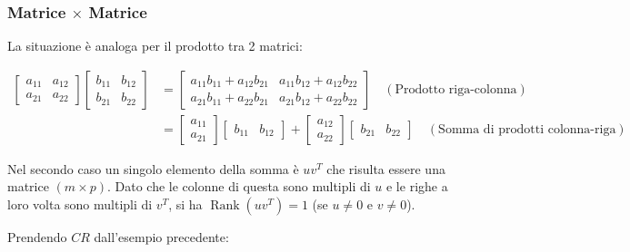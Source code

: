 \documentclass{article}
\begin{document}
\subsubsection{\texorpdfstring{Matrice $\times$ Matrice}{Matrice x Matrice}}

La situazione è analoga per il prodotto tra 2 matrici:

\begin{align*}
\begin{bmatrix}
a_{11} & a_{12} \\
a_{21} & a_{22}
\end{bmatrix}
\begin{bmatrix}
b_{11} & b_{12} \\
b_{21} & b_{22}
\end{bmatrix}&=
\begin{bmatrix}
a_{11}b_{11}+a_{12}b_{21} &
a_{11}b_{12}+a_{12}b_{22}
\\
a_{21}b_{11}+a_{22}b_{21} &
a_{21}b_{12}+a_{22}b_{22}
\end{bmatrix}
\quad(\text{Prodotto riga-colonna})
\\[1em]
&=
\begin{bmatrix}
a_{11}\\
a_{21}
\end{bmatrix}
\begin{bmatrix}
b_{11} & b_{12}
\end{bmatrix}
+
\begin{bmatrix}
a_{12}\\
a_{22}
\end{bmatrix}
\begin{bmatrix}
b_{21} & b_{22}
\end{bmatrix}
\quad(\text{Somma di prodotti colonna-riga})
\end{align*}\newline

Nel secondo caso un singolo elemento della somma è $uv^T$ che risulta essere una matrice $(m\times p)$. Dato che le colonne di questa sono multipli di $u$ e le righe a loro volta sono multipli di $v^T$, si ha $\operatorname{Rank}(uv^T)=1$ (se $u\neq0$ e $v\neq0$).\newline

Prendendo $CR$ dall'esempio precedente:
\end{document}
